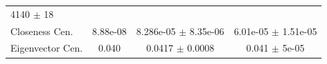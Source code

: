 \documentclass[12pt,twoside]{amherstthesis}
\begin{document}
\begin{longtable}[]{@{}lccc@{}}
\begin{minipage}[t]{0.29\columnwidth}
  4140 \(\pm\) 18\strut
  \end{minipage}\tabularnewline
  \begin{minipage}[t]{0.20\columnwidth}\raggedright\strut
  Closeness Cen.\strut
  \end{minipage} & \begin{minipage}[t]{0.12\columnwidth}\centering\strut
  8.88e-08\strut
  \end{minipage} & \begin{minipage}[t]{0.27\columnwidth}\centering\strut
  8.286e-05 \(\pm\) 8.35e-06\strut
  \end{minipage} & \begin{minipage}[t]{0.29\columnwidth}\centering\strut
  6.01e-05 \(\pm\) 1.51e-05\strut
  \end{minipage}\tabularnewline
  \begin{minipage}[t]{0.20\columnwidth}\raggedright\strut
  Eigenvector Cen.\strut
  \end{minipage} & \begin{minipage}[t]{0.12\columnwidth}\centering\strut
  0.040\strut
  \end{minipage} & \begin{minipage}[t]{0.27\columnwidth}\centering\strut
  0.0417 \(\pm\) 0.0008\strut
  \end{minipage} & \begin{minipage}[t]{0.29\columnwidth}\centering\strut
  0.041 \(\pm\) 5e-05\strut
  \end{minipage}\tabularnewline
  \bottomrule
  \end{longtable}
  
\end{document}

